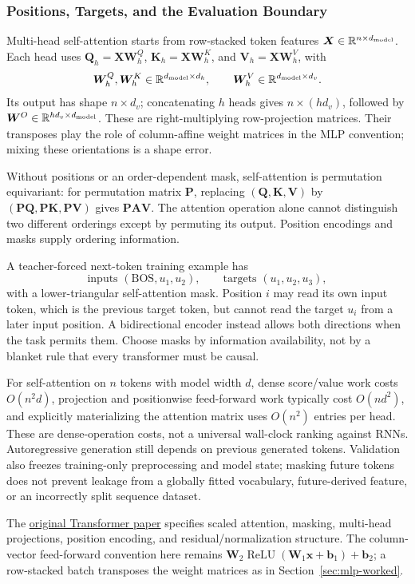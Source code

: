 \documentclass[11pt,twoside]{article}
\numberwithin{equation}{section}
\newcommand{\R}{\mathbb{R}}
\newcommand{\vect}[1]{\bm{#1}}
\newcommand{\mat}[1]{\bm{#1}}
\theoremstyle{plain}
\theoremstyle{definition}
\theoremstyle{remark}
\begin{document}
\subsubsection{Positions, Targets, and the Evaluation Boundary}
Multi-head self-attention starts from row-stacked token features $\mat X\in\R^{n\times d_{\rm model}}$. Each head uses $\mat Q_h=\mat X\mat W_h^Q$, $\mat K_h=\mat X\mat W_h^K$, and $\mat V_h=\mat X\mat W_h^V$, with
\[
\mat W_h^Q,\mat W_h^K\in\R^{d_{\rm model}\times d_k},\qquad
\mat W_h^V\in\R^{d_{\rm model}\times d_v}.
\]
Its output has shape $n\times d_v$; concatenating $h$ heads gives $n\times(hd_v)$, followed by $\mat W^O\in\R^{hd_v\times d_{\rm model}}$. These are right-multiplying row-projection matrices. Their transposes play the role of column-affine weight matrices in the MLP convention; mixing these orientations is a shape error.

Without positions or an order-dependent mask, self-attention is permutation equivariant: for permutation matrix $\mat P$, replacing $(\mat Q,\mat K,\mat V)$ by $(\mat P\mat Q,\mat P\mat K,\mat P\mat V)$ gives $\mat P\mat A\mat V$. The attention operation alone cannot distinguish two different orderings except by permuting its output. Position encodings and masks supply ordering information.

A teacher-forced next-token training example has
\[
\text{inputs }(\mathrm{BOS},u_1,u_2),\qquad\text{targets }(u_1,u_2,u_3),
\]
with a lower-triangular self-attention mask. Position $i$ may read its own input token, which is the previous target token, but cannot read the target $u_i$ from a later input position. A bidirectional encoder instead allows both directions when the task permits them. Choose masks by information availability, not by a blanket rule that every transformer must be causal.

For self-attention on $n$ tokens with model width $d$, dense score/value work costs $O(n^2d)$, projection and positionwise feed-forward work typically cost $O(nd^2)$, and explicitly materializing the attention matrix uses $O(n^2)$ entries per head. These are dense-operation costs, not a universal wall-clock ranking against RNNs. Autoregressive generation still depends on previous generated tokens. Validation also freezes training-only preprocessing and model state; masking future tokens does not prevent leakage from a globally fitted vocabulary, future-derived feature, or an incorrectly split sequence dataset.

The \href{https://arxiv.org/abs/1706.03762}{original Transformer paper} specifies scaled attention, masking, multi-head projections, position encoding, and residual/normalization structure. The column-vector feed-forward convention here remains $\mat W_2\operatorname{ReLU}(\mat W_1\vect x+\vect b_1)+\vect b_2$; a row-stacked batch transposes the weight matrices as in Section~\ref{sec:mlp-worked}.
\end{document}
